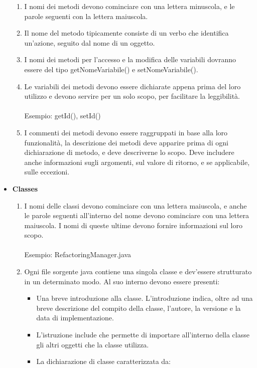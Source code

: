 \documentclass[11pt]{article}
\begin{document}
\begin{itemize}
			\begin{enumerate}
				\item I nomi dei metodi devono cominciare con una lettera minuscola, e le parole seguenti con la
				lettera maiuscola. 
				\item Il nome del metodo tipicamente consiste di un verbo che identifica un'azione, seguito dal nome di un oggetto. 
				\item I nomi dei metodi per l’accesso e la modifica delle
				variabili dovranno essere del tipo getNomeVariabile() e setNomeVariabile().
				\item Le variabili dei metodi devono essere dichiarate appena prima del loro utilizzo e devono servire per un solo	scopo, per facilitare la leggibilità.\\\\
				Esempio: getId(), setId()\\
				\item I commenti dei metodi devono essere raggruppati in base alla loro funzionalità, la descrizione
				dei metodi deve apparire prima di ogni dichiarazione di metodo, e deve descriverne lo scopo.
				Deve includere anche informazioni sugli argomenti, sul valore di ritorno, e se applicabile, sulle
				eccezioni.
			\end{enumerate}
			\item \textbf{Classes}
			\begin{enumerate}
				\item I nomi delle classi devono cominciare con una lettera maiuscola, e anche le parole seguenti all’interno del nome devono cominciare con una lettera maiuscola. I nomi di queste ultime devono fornire informazioni sul loro scopo.\\\\
				Esempio: RefactoringManager.java\\
				\item Ogni file sorgente java contiene una singola classe e dev’essere strutturato in un 
				determinato modo. Al suo interno devono essere presenti:
				\begin{itemize}
					\item Una breve introduzione alla classe. L'introduzione indica, oltre ad una breve descrizione del compito della classe, l'autore, la versione e la data di implementazione.
					\item L’istruzione include che permette di importare all’interno della classe gli altri oggetti che la classe utilizza.
					\item La dichiarazione di classe caratterizzata da:

\end{itemize}
\end{enumerate}
\end{itemize}
\end{document}
